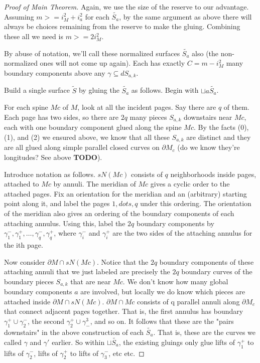 \documentclass[12pt]{amsart}
\theoremstyle{definition}
\theoremstyle{remark}
\newcommand{\bd}{\partial}
\newcommand{\cin}{\subseteq}
\begin{document}
\begin{proof}[Proof of Main Theorem]
Again, we use the size of the reserve to our advantage. Assuming $m>=i_M^2
+ i_a^2$ for each $\widetilde{S_a}$, by the same argument as above there will always be
choices remaining from the reserve to make the gluing. Combining these all we
need is $m>= 2i_M^2$.

By abuse of notation, we'll call these normalized surfaces $\widetilde{S_a}$ also (the
non-normalized ones will not come up again). Each has exactly $C = m - i_M^2$
many boundary components above any $\gamma \cin dS_{a,k}$.

Build a single surface $\widetilde{S}$ by gluing the $\widetilde{S_a}$ as follows. Begin with
$\sqcup a \widetilde{S_a}$.

For each spine $Mc$ of $M$, look at all the incident pages. Say there are $q$
of them.  Each page has two sides, so there are $2q$ many pieces $S_{a,k}$
downstairs near $Mc$, each with one boundary component glued along the spine
$Mc$.  By the facts (0), (1), and (2) we ensured above, we know that all these
$S_{a,k}$ are distinct and they are all glued along simple parallel closed curves
on $\bd M_c$ (do we know they're longitudes?  See above {\bf TODO}).

Introduce notation as follows. $sN(Mc)$ consists of $q$ neighborhoods inside
pages, attached to $Mc$ by annuli. The meridian of $Mc$ gives a cyclic order to
the attached pages.  Fix an orientation for the meridian and an (arbitrary)
starting point along it, and label the pages $1, dots, q$ under this ordering.
The orientation of the meridian also gives an ordering of the boundary
components of each attaching annulus.  Using this, label the $2q$ boundary
components by $\gamma_1^-,\gamma_1^+,\dots, \gamma_q^-,\gamma_q^+$, where
$\gamma_i^-$ and $\gamma_i^+$ are the two sides of the attaching annulus for
the ith page.

Now consider $\bd M \cap sN(Mc)$. Notice that the $2q$ boundary components of these
attaching annuli that we just labeled are precisely the $2q$ boundary curves of
the boundary pieces $S_{a,k}$ that are near $Mc$. We don't know how many global
boundary components $a$ are involved, but locally we do know which pieces are
attached inside $\bd M \cap sN(Mc)$. $\bd M \cap Mc$ consists of q parallel annuli
along $\bd M_c$ that connect adjacent pages together. That is, the first annulus
has boundary $\gamma_1^+ \cup \gamma_2^-$, the second $\gamma_2^+ \cup
\gamma^3_-$, and so on.  It follows that these are the "pairs downstairs" in
the above construction of each $\widetilde{S_a}$. That is, these are the curves
we called $\gamma$ and $\gamma'$ earlier.  So within $\sqcup \widetilde{S_a}$,
the existing gluings only glue lifts of $\gamma_1^+$ to lifts of $\gamma_2^-$,
lifts of $\gamma_2^+$ to lifts of $\gamma_3^-$, etc etc.


\end{proof}
\end{document}
